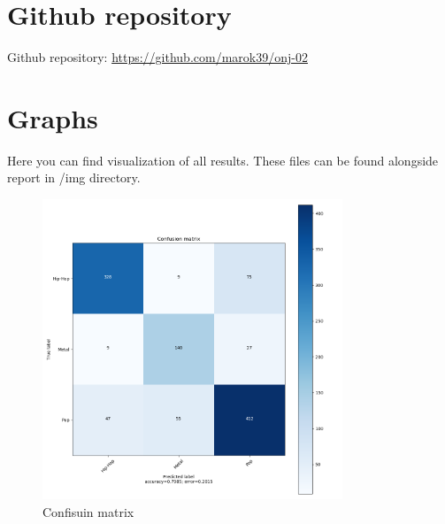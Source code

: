 \documentclass[a4paper,11pt]{article}
\begin{document}
\pagebreak
\section{Github repository}
Github repository: \href{https://github.com/marok39/onj-02}{https://github.com/marok39/onj-02}


\appendix
\appendixpage
\section{\label{label-graphs} Graphs}

Here you can find visualization of all results. These files can be found alongside report in /img directory.

\begin{figure}[h]
\begin{center}
\includegraphics[width=0.8\textwidth]{./img/matrix.png}
\end{center}
\caption{Confisuin matrix}
\label{label-cf-matrix}
\end{figure}
\end{document}
